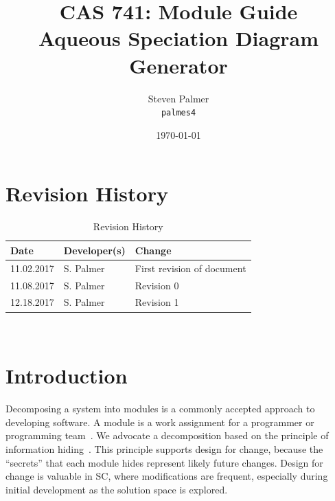 \documentclass[12pt, titlepage]{article}
\begin{document}

\title{CAS 741: Module Guide\\[10pt]\Large Aqueous Speciation Diagram Generator}
\author{Steven Palmer\\\texttt{palmes4}}
\date{\today}
	
\maketitle


\setcounter{secnumdepth}{0}

\section{Revision History}

\begin{table}[hp]
\caption{Revision History} \label{TblRevisionHistory}
\begin{tabularx}{\textwidth}{llX}
\toprule
\textbf{Date} & \textbf{Developer(s)} & \textbf{Change}\\
\midrule
11.02.2017 & S. Palmer & First revision of document\\
11.08.2017 & S. Palmer & Revision 0\\
12.18.2017 & S. Palmer & Revision 1\\
\bottomrule
\end{tabularx}
\end{table}

~\newpage

\tableofcontents

\listoftables

\listoffigures

\newpage


\setcounter{secnumdepth}{3}

\section{Introduction}

Decomposing a system into modules is a commonly accepted approach to developing
software.  A module is a work assignment for a programmer or programming
team~\citep{ParnasEtAl1984}.  We advocate a decomposition
based on the principle of information hiding~\citep{Parnas1972a}.  This
principle supports design for change, because the ``secrets'' that each module
hides represent likely future changes.  Design for change is valuable in SC,
where modifications are frequent, especially during initial development as the
solution space is explored.  
\end{document}
